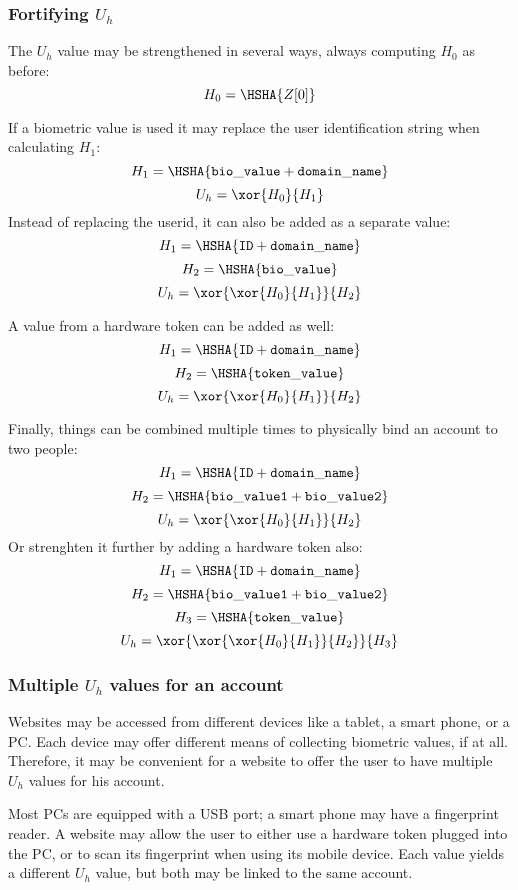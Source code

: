 \subsubsection{Fortifying $U_h$}
The $U_h$ value may be strengthened in several ways, always computing $H_0$ as before:
\[H_0=\HSHA{Z[0]}\]
\par
If a biometric value is used it may replace the user identification string when calculating $H_1$:
\[H_1=\HSHA{\mathtt{bio\_value+domain\_name}}\]
\[U_h=\xor{H_0}{H_1}\]
Instead of replacing the userid,
it can also be added as a separate value:
\[H_1=\HSHA{\mathtt{ID+domain\_name}}\]
\[H_2=\HSHA{\mathtt{bio\_value}}\]
\[U_h=\xor{\xor{H_0}{H_1}}{H_2}\]
\par
A value from a hardware token can be added as well:
\[H_1=\HSHA{\mathtt{ID+domain\_name}}\]
\[H_2=\HSHA{\mathtt{token\_value}}\]
\[U_h=\xor{\xor{H_0}{H_1}}{H_2}\]
\par
Finally,
things can be combined multiple times
to physically bind an account to two people:
\[H_1=\HSHA{\mathtt{ID+domain\_name}}\]
\[H_2=\HSHA{\mathtt{bio\_value1+bio\_value2}}\]
\[U_h=\xor{\xor{H_0}{H_1}}{H_2}\]
Or strenghten it further by adding a hardware token also:
\[H_1=\HSHA{\mathtt{ID+domain\_name}}\]
\[H_2=\HSHA{\mathtt{bio\_value1+bio\_value2}}\]
\[H_3=\HSHA{\mathtt{token\_value}}\]
\[U_h=\xor{\xor{\xor{H_0}{H_1}}{H_2}}{H_3}\]
\subsubsection{Multiple $U_h$ values for an account}
Websites may be accessed from different devices like a tablet, a smart phone, or a PC.
Each device may offer different means of collecting biometric values, if at all.
Therefore, it may be convenient for a website to offer the user to have multiple $U_h$ values for his account.
\par
Most PCs are equipped with a USB port; a smart phone may have a fingerprint reader.
A website may allow the user to either use a hardware token plugged into the PC,
or to scan its fingerprint when using its mobile device.
Each value yields a different $U_h$ value,
but both may be linked to the same account.
